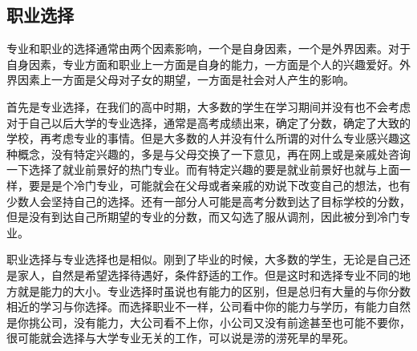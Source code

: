 \subsection{职业选择}

专业和职业的选择通常由两个因素影响，一个是自身因素，一个是外界因素。对于自身因素，专业方面和职业上一方面是自身的能力，一方面是个人的兴趣爱好。外界因素上一方面是父母对子女的期望，一方面是社会对人产生的影响。

首先是专业选择，在我们的高中时期，大多数的学生在学习期间并没有也不会考虑对于自己以后大学的专业选择，通常是高考成绩出来，确定了分数，确定了大致的学校，再考虑专业的事情。但是大多数的人并没有什么所谓的对什么专业感兴趣这种概念，没有特定兴趣的，多是与父母交换了一下意见，再在网上或是亲戚处咨询一下选择了就业前景好的热门专业。而有特定兴趣的要是就业前景好也就与上面一样，要是是个冷门专业，可能就会在父母或者亲戚的劝说下改变自己的想法，也有少数人会坚持自己的选择。还有一部分人可能是高考分数到达了目标学校的分数，但是没有到达自己所期望的专业的分数，而又勾选了服从调剂，因此被分到冷门专业。        

职业选择与专业选择也是相似。刚到了毕业的时候，大多数的学生，无论是自己还是家人，自然是希望选择待遇好，条件舒适的工作。但是这时和选择专业不同的地方就是能力的大小。专业选择时虽说也有能力的区别，但是总归有大量的与你分数相近的学习与你选择。而选择职业不一样，公司看中你的能力与学历，有能力自然是你挑公司，没有能力，大公司看不上你，小公司又没有前途甚至也可能不要你，很可能就会选择与大学专业无关的工作，可以说是涝的涝死旱的旱死。